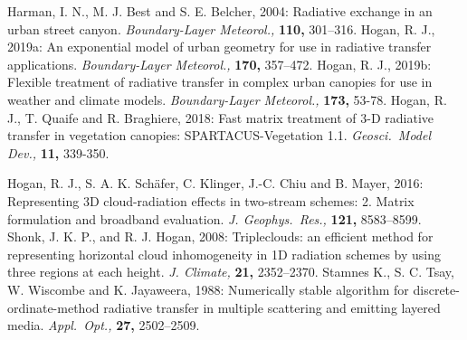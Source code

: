 \documentclass[a4,oneside]{article}
\begin{document}
\begin{thebibliography}{00}
%
Harman, I. N.,
M. J. Best and S. E. Belcher, 2004: Radiative exchange in an urban
street canyon. \textit{Boundary-Layer Meteorol.,} \textbf{110,}
301--316.
%
Hogan, R. J., 2019a: An
exponential model of urban geometry for use in radiative transfer
applications. \textit{Boundary-Layer Meteorol.,} \textbf{170,}
357--472.
%
Hogan, R. J., 2019b: Flexible
treatment of radiative transfer in complex urban canopies for use in
weather and climate models. \textit{Boundary-Layer Meteorol.,}
\textbf{173,} 53-78.
%
Hogan, R. J., T. Quaife
and R. Braghiere, 2018: Fast matrix treatment of 3-D radiative
transfer in vegetation canopies: SPARTACUS-Vegetation
1.1. \textit{Geosci.\ Model Dev.,} \textbf{11,} 339-350.
%

%
%
Hogan, R. J.,
S. A. K. Sch\"afer, C. Klinger, J.-C. Chiu and B. Mayer, 2016:
Representing 3D cloud-radiation effects in two-stream schemes:
2. Matrix formulation and broadband
evaluation. \textit{J. Geophys.\ Res.,} \textbf{121,} 8583--8599.
%
%
Shonk, J. K. P., and
R. J. Hogan, 2008: Tripleclouds: an efficient method for representing
horizontal cloud inhomogeneity in 1D radiation schemes by using three
regions at each height. \textit{J. Climate,} \textbf{21,} 2352--2370.
%
Stamnes K.,
S. C. Tsay, W. Wiscombe and K. Jayaweera, 1988: Numerically stable
algorithm for discrete-ordinate-method radiative transfer in multiple
scattering and emitting layered media. \textit{Appl.\ Opt.,}
\textbf{27,} 2502--2509.
\end{thebibliography}
\end{document}

